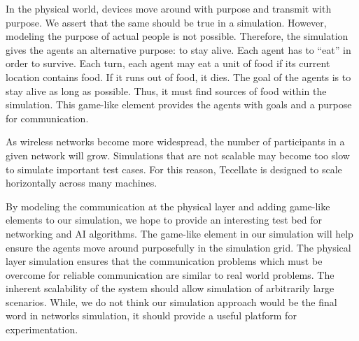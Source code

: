 \documentclass[12pt]{article}
\begin{document}
In the physical world, devices move around with purpose and transmit with purpose. We assert that
the same should be true in a simulation. However, modeling the purpose of actual people is not
possible. Therefore, the simulation gives the agents an alternative purpose: to stay alive. Each
agent has to ``eat'' in order to survive. Each turn, each agent may eat a unit of food if its
current location contains food. If it runs out of food, it dies. The goal of the agents is to stay
alive as long as possible. Thus, it must find sources of food within the simulation. This game-like
element provides the agents with goals and a purpose for communication.

As wireless networks become more widespread, the number of participants in a given network will
grow. Simulations that are not scalable may become too slow to simulate important test cases. For
this reason, Tecellate is designed to scale horizontally across many machines.

By modeling the communication at the physical layer and adding game-like elements to our simulation,
we hope to provide an interesting test bed for networking and AI algorithms. The game-like element
in our simulation will help ensure the agents move around purposefully in the simulation grid. The
physical layer simulation ensures that the communication problems which must be overcome for
reliable communication are similar to real world problems. The inherent scalability of the system
should allow simulation of arbitrarily large scenarios. While, we do not think our simulation
approach would be the final word in networks simulation, it should provide a useful platform for
experimentation.













\nocite{*}


\end{document}

